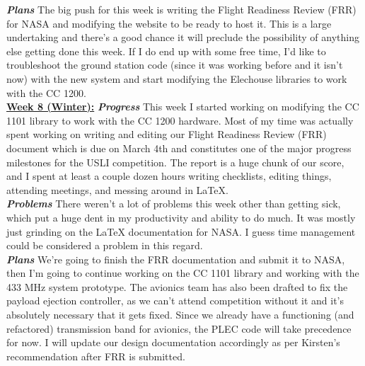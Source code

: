 \documentclass[onecolumn, draftclsnofoot, 10pt, compsoc]{IEEEtran}
\begin{document}
\textbf{\textit{{Plans}}}
\newline The big push for this week is writing the Flight Readiness Review (FRR) for NASA and modifying the website to be ready to host it. This is a large undertaking and there's a good chance it will preclude the possibility of anything else getting done this week. If I do end up with some free time, I'd like to troubleshoot the ground station code (since it was working before and it isn't now) with the new system and start modifying the Elechouse libraries to work with the CC 1200. \\

\underline{\textbf{Week 8 (Winter):}}
\newline\textbf{\textit{{Progress}}}
\newline This week I started working on modifying the CC 1101 library to work with the CC 1200 hardware. Most of my time was actually spent working on writing and editing our Flight Readiness Review (FRR) document which is due on March 4th and constitutes one of the major progress milestones for the USLI competition. The report is a huge chunk of our score, and I spent at least a couple dozen hours writing checklists, editing things, attending meetings, and messing around in LaTeX. \\

\textbf{\textit{{Problems}}}
\newline There weren't a lot of problems this week other than getting sick, which put a huge dent in my productivity and ability to do much. It was mostly just grinding on the LaTeX documentation for NASA. I guess time management could be considered a problem in this regard. \\

\textbf{\textit{{Plans}}}
\newline We're going to finish the FRR documentation and submit it to NASA, then I'm going to continue working on the CC 1101 library and working with the 433 MHz system prototype. The avionics team has also been drafted to fix the payload ejection controller, as we can't attend competition without it and it's absolutely necessary that it gets fixed. Since we already have a functioning (and refactored) transmission band for avionics, the PLEC code will take precedence for now. I will update our design documentation accordingly as per Kirsten's recommendation after FRR is submitted. \\
\end{document}
